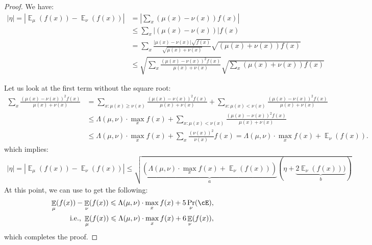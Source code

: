 \documentclass[11pt,letterpaper]{article}
\DeclareMathOperator*{\E}{\mathbb{E}}
\renewcommand{\geq}{\geqslant}
\renewcommand{\leq}{\leqslant}
\theoremstyle{definition}
\begin{document}
\begin{proof}
We have:
\begin{align*}
    |\eta|=\left|\E_\mu(f(x)) - \E_\nu(f(x))\right| &= \left|\sum_x(\mu(x) - \nu(x))f(x)\right|\\
    &\leq \sum_x\left|(\mu(x) - \nu(x))\right|f(x)\tag{By triangle inequality}\\
    &= \sum_x\frac{|\mu(x) - \nu(x)|\sqrt{f(x)}}{\sqrt{\mu(x) + \nu(x)}} \sqrt{(\mu(x) + \nu(x)) f(x)}\\
    &\leq \sqrt{\sum_x\frac{(\mu(x) - \nu(x))^2f(x)}{\mu(x) + \nu(x)}} \sqrt{\sum_x(\mu(x) + \nu(x)) f(x)}\tag{By Cauchy-Schwarz}
\end{align*}

\noindent
Let us look at the first term without the square root:
\begin{align*}
    \sum_x\frac{(\mu(x) - \nu(x))^2f(x)}{\mu(x) + \nu(x)} &= \sum_{x: \mu(x) \geq \nu(x)}\frac{(\mu(x) - \nu(x))^2f(x)}{\mu(x) + \nu(x)} + \sum_{x: \mu(x) < \nu(x)}\frac{(\mu(x) - \nu(x))^2f(x)}{\mu(x) + \nu(x)}\\
    &\leq \Lambda(\mu,\nu)\cdot \max_x f(x) + \sum_{x: \mu(x) < \nu(x)}\frac{(\mu(x) - \nu(x))^2f(x)}{\mu(x) + \nu(x)}\\
    &\leq \Lambda(\mu,\nu)\cdot \max_x f(x) + \sum_{x}\frac{(\nu(x))^2}{\nu(x)}f(x) = \Lambda(\mu,\nu)\cdot \max_x f(x) + \E_\nu(f(x)).
\end{align*}
which implies:
\begin{align*}
    |\eta|=\left|\E_\mu(f(x)) - \E_\nu(f(x))\right| \leq \sqrt{\underbrace{(\Lambda(\mu,\nu)\cdot \max_x f(x) + \E_\nu(f(x)))}_{a} (\eta+ \underbrace{2\E_\nu(f(x)))}_b)}
\end{align*}
At this point, we can use  to get the following:
\begin{align*}
    \E_\mu(f(x)) - \E_\nu(f(x)) \leq \Lambda(\mu,\nu)\cdot \max_x f(x) + 5\Pr_\nu(\cE),\\
    \text{i.e., }\E_\mu(f(x))\leq \Lambda(\mu,\nu)\cdot \max_x f(x) + 6\E_\nu(f(x)),
\end{align*}
which completes the proof.
\end{proof}

\convex*
\end{document}

